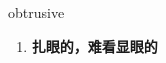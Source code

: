 
\begin{frame}
{\huge obtrusive}
\begin{center}
\begin{enumerate}\Large
  \item \textbf{扎眼的，难看显眼的}
\end{enumerate}
\end{center}
\end{frame}
